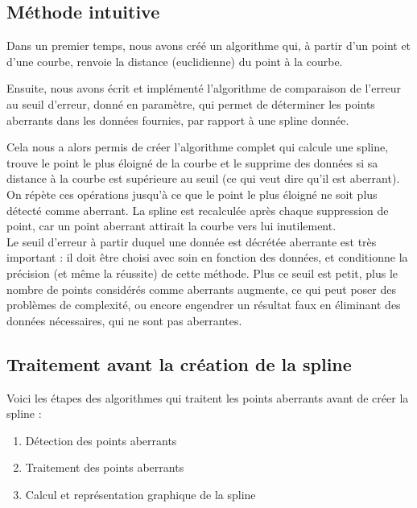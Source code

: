\documentclass[a4paper,12pt]{article} %
\begin{document}
		\subsection{Méthode intuitive}
			
			   
            Dans un premier temps, nous avons créé un algorithme qui, à partir d'un point et d'une courbe, renvoie la distance (euclidienne) du point à la courbe.
                
            Ensuite, nous avons écrit et implémenté l'algorithme de comparaison de l'erreur au seuil d'erreur, donné en paramètre, qui permet de déterminer les points aberrants dans les données fournies, par rapport à une spline donnée.
                
            Cela nous a alors permis de créer l'algorithme complet qui calcule une spline, trouve le point le plus éloigné de la courbe et le supprime des données si sa distance à la courbe est supérieure au seuil (ce qui veut dire qu'il est aberrant). On répète ces opérations jusqu'à ce que le point le plus éloigné ne soit plus détecté comme aberrant. La spline est recalculée après chaque suppression de point, car un point aberrant attirait la courbe vers lui inutilement.\\
                
             Le seuil d'erreur à partir duquel une donnée est décrétée aberrante est très important : il doit être choisi avec soin en fonction des données, et conditionne la précision (et même la réussite) de cette méthode. Plus ce seuil est petit, plus le nombre de points considérés comme aberrants augmente, ce qui peut poser des problèmes de complexité, ou encore engendrer un résultat faux en éliminant des données nécessaires, qui ne sont pas aberrantes.
                
                
		\subsection{Traitement avant la création de la spline}
		    Voici les étapes des algorithmes qui traitent les points aberrants avant de créer la spline :
		    \begin{enumerate}
                \item Détection des points aberrants
                \item Traitement des points aberrants
                \item Calcul et représentation graphique de la spline
		    \end{enumerate}
			  
\end{document}
